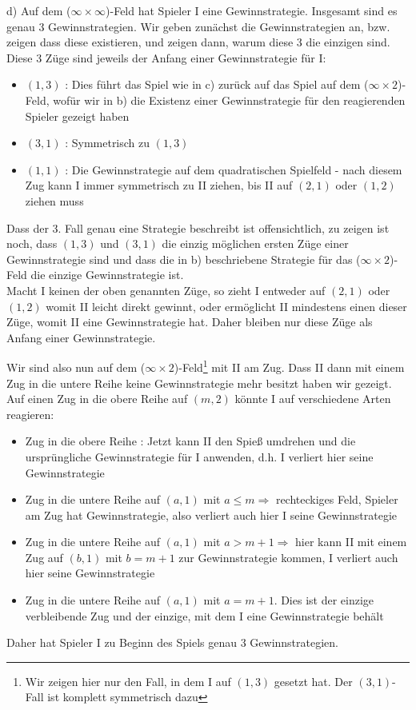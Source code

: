 \documentclass{scrartcl}
\begin{document}
d) Auf dem ($\infty \times \infty$)-Feld hat Spieler I eine Gewinnstrategie. Insgesamt sind es genau
3 Gewinnstrategien. Wir geben zunächst die Gewinnstrategien an, bzw. zeigen dass diese existieren,
und zeigen dann, warum diese 3 die einzigen sind. Diese 3 Züge sind jeweils der Anfang einer
Gewinnstrategie für I:
\begin{itemize}
\item{$(1,3)$ : Dies führt das Spiel wie in c) zurück auf das Spiel auf dem ($\infty \times 2$)-Feld,
wofür wir in b) die Existenz einer Gewinnstrategie für den reagierenden Spieler gezeigt haben}
\item{$(3,1)$ : Symmetrisch zu $(1,3)$}
\item{$(1,1)$ : Die Gewinnstrategie auf dem quadratischen Spielfeld - nach diesem Zug kann I immer 
symmetrisch zu II ziehen, bis II auf $(2,1)$ oder $(1,2)$ ziehen muss}
\end{itemize}

Dass der 3. Fall genau eine Strategie beschreibt ist offensichtlich, zu zeigen ist noch, dass $(1,3)$
und $(3,1)$ die einzig möglichen ersten Züge einer Gewinnstrategie sind und dass die in
b) beschriebene Strategie für das ($\infty \times 2$)-Feld die einzige Gewinnstrategie ist. \\

Macht I keinen der oben genannten Züge, so zieht I entweder auf $(2,1)$ oder $(1,2)$ womit II leicht
direkt gewinnt, oder ermöglicht II mindestens einen dieser Züge, womit II eine Gewinnstrategie hat.
Daher bleiben nur diese Züge als Anfang einer Gewinnstrategie.

Wir sind also nun auf dem ($\infty \times 2$)-Feld\footnote{Wir zeigen hier nur den Fall, in dem I auf
$(1,3)$ gesetzt hat. Der $(3,1)$-Fall ist komplett symmetrisch dazu} mit II am Zug. Dass II dann mit 
einem Zug in die untere Reihe keine Gewinnstrategie mehr besitzt haben wir gezeigt. Auf einen Zug in 
die obere Reihe auf $(m,2)$ könnte I auf verschiedene Arten reagieren:
\begin{itemize}
\item{Zug in die obere Reihe : Jetzt kann II den Spieß umdrehen und die ursprüngliche Gewinnstrategie
für I anwenden, d.h. I verliert hier seine Gewinnstrategie}
\item{Zug in die untere Reihe auf $(a,1)$ mit $a \leq m \Rightarrow$
rechteckiges Feld, Spieler am Zug hat Gewinnstrategie, also verliert auch hier I seine Gewinnstrategie}
\item{Zug in die untere Reihe auf $(a,1)$ mit $a > m+1 \Rightarrow$ hier
kann II mit einem Zug auf $(b,1)$ mit $b=m+1$ zur Gewinnstrategie kommen, I verliert auch hier seine
Gewinnstrategie}
\item{Zug in die untere Reihe auf $(a,1)$ mit $a = m+1$. Dies ist der einzige verbleibende Zug und der
einzige, mit dem I eine Gewinnstrategie behält}
\end{itemize}
Daher hat Spieler I zu Beginn des Spiels genau 3 Gewinnstrategien.
\end{document}
